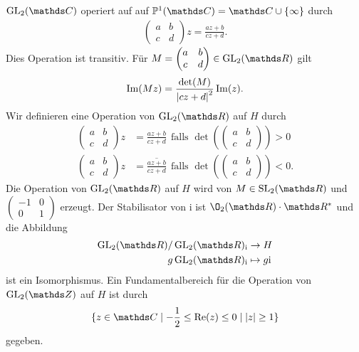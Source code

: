 $\GL_2(\C)$ operiert auf auf $\mathbb{P}^1(\C)=\C\cup \{\infty\}$ durch
\begin{align*}
\begin{pmatrix}
a&b\\
c&d
\end{pmatrix}z=\frac{az+b}{cz+d}.
\end{align*}
Dies Operation ist transitiv.
Für $M=\begin{pmatrix}
a&b\\
c&d
\end{pmatrix} \in \GL_2(\R)$ gilt
\begin{align*}
\operatorname{Im}(Mz)=\frac{\det(M)}{\left\vert cz+d\right\vert^2} \operatorname{Im}(z).
\end{align*}
Wir definieren eine Operation von $\GL_2(\R)$ auf $H$ durch
\begin{align*}
\begin{pmatrix}
a&b\\
c&d
\end{pmatrix} z&=\frac{az+b}{cz+d}~~\text{falls } \det(\begin{pmatrix}
a&b\\
c&d
\end{pmatrix})>0\\
\begin{pmatrix}
a&b\\
c&d
\end{pmatrix} z&=\overline{\frac{az+b}{cz+d}}~~\text{falls } \det(\begin{pmatrix}
a&b\\
c&d
\end{pmatrix})<0.
\end{align*}
Die Operation von $\GL_2(\R)$ auf $H$ wird von $M \in \SL_2(\R)$ und $\begin{pmatrix}
-1&0\\
0&1
\end{pmatrix}$
erzeugt.
Der Stabilisator von $\mathrm{i}$ ist $\O_2(\R)\cdot \R^\ast$ und die Abbildung
\begin{align*}
\GL_2(\R)/\GL_2(\R)_\mathrm{i} &\to H\\
g \GL_2(\R)_\mathrm{i} &\mapsto g\mathrm{i}
\end{align*}
ist ein Isomorphismus.
Ein Fundamentalbereich für die Operation von $\GL_2(\Z)$ auf $H$ ist durch
\begin{align*} 
\{z\in \C \mid -\frac{1}{2} \leq \Ret(z)\leq 0 \mid \abs{z}\geq1\}
\end{align*}
gegeben.

